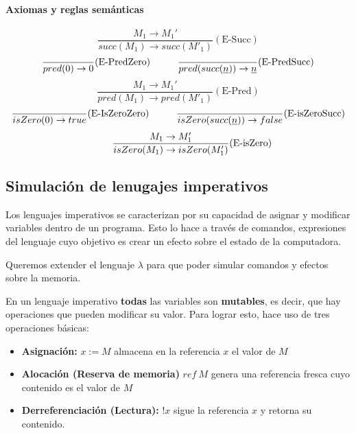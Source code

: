 \paragraph{Axiomas y reglas semánticas}

\begin{equation*}
\frac{M_1\to M_1'}{succ(M_1)\to succ(M'_1)}(\text{E-Succ})
\end{equation*}
\vspace*{5mm}
\begin{equation*}
\frac{}{pred(0)\to 0}(\text{E-PredZero})\hspace*{1cm}\frac{}{pred(succ(\underline{n}))\to \underline{n}}(\text{E-PredSucc})
\end{equation*}
\vspace*{5mm}
\begin{equation*}
\frac{M_1\to M_1'}{pred(M_1)\to pred(M'_1)}(\text{E-Pred})
\end{equation*}
\vspace*{5mm}
\begin{equation*}
\frac{}{isZero(0)\to true}(\text{E-IsZeroZero})\hspace*{1cm}\frac{}{isZero(succ(\underline{n}))\to false}(\text{E-isZeroSucc})
\end{equation*}
\vspace*{5mm}
\begin{equation*}
\hspace*{1cm}\frac{M_1\to M'_1}{isZero(M_1)\to isZero(M_1')}(\text{E-isZero})
\end{equation*}



\subsection{Simulación de lenugajes imperativos}
Los lenguajes imperativos se caracterizan por su capacidad de asignar y modificar variables dentro de un programa. Esto lo hace a través de comandos, expresiones del lenguaje cuyo objetivo es crear un efecto sobre el estado de la computadora. 

Queremos extender el lenguaje $\lambda$ para que poder simular comandos y efectos sobre la memoria.

En un lenguaje imperativo \textbf{todas} las variables son \textbf{mutables}, es decir, que hay operaciones que pueden modificar su valor. Para lograr esto, hace uso de tres operaciones básicas:

\begin{itemize}
    \item \textbf{Asignación:} $x := M$ almacena en la referencia $x$ el valor de $M$
    \item \textbf{Alocación (Reserva de memoria)} $ref~M$ genera una referencia fresca cuyo contenido es el valor de $M$
    \item \textbf{Derreferenciación (Lectura):} $!x$ sigue la referencia $x$ y retorna su contenido.
\end{itemize}


